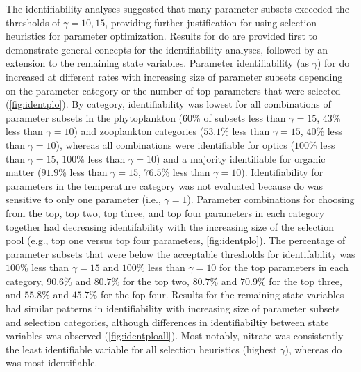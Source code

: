 \documentclass[letterpaper,12pt,oneside]{article}\usepackage[]{graphicx}\usepackage[]{color}
\begin{document}
The identifiability analyses suggested that many parameter subsets exceeded the thresholds of $\gamma = 10, 15$, providing further justification for using selection heuristics for parameter optimization.  Results for \ac{do} are provided first to demonstrate general concepts for the identifiability analyses, followed by an extension to the remaining state variables.  Parameter identifiability (as $\gamma$) for \ac{do} increased at different rates with increasing size of parameter subsets depending on the parameter category or the number of top parameters that were selected (\cref{fig:identplo}). By category, identifiability was lowest for all combinations of parameter subsets in the phytoplankton ($60$\% of subsets less than $\gamma = 15$, $43$\% less than $\gamma = 10$) and zooplankton categories ($53.1$\% less than $\gamma = 15$, $40$\% less than $\gamma = 10$), whereas all combinations were identifiable for optics ($100$\% less than $\gamma = 15$, $100$\% less than $\gamma = 10$) and a majority identifiable for organic matter ($91.9$\% less than $\gamma = 15$, $76.5$\% less than $\gamma = 10$). Identifiability for parameters in the temperature category was not evaluated because \ac{do} was sensitive to only one parameter (i.e., $\gamma = 1$). Parameter combinations for choosing from the top, top two, top three, and top four parameters in each category together had decreasing identifability with the increasing size of the selection pool (e.g., top one versus top four parameters, \cref{fig:identplo}).  The percentage of parameter subsets that were below the acceptable thresholds for identifability was $100$\% less than $\gamma = 15$ and $100$\% less than $\gamma = 10$ for the top parameters in each category, $90.6$\% and $80.7$\% for the top two, $80.7$\% and $70.9$\% for the top three, and $55.8$\% and $45.7$\% for the fop four.  Results for the remaining state variables had similar patterns in identifiability with increasing size of parameter subsets and selection categories, although differences in identifiabiltiy between state variables was observed (\cref{fig:identploall}).  Most notably, nitrate was consistently the least identifiable variable for all selection heuristics (highest $\gamma$), whereas \ac{do} was most identifiable.
\end{document}
